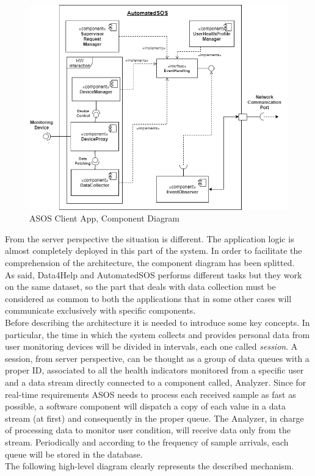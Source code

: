 \begin{flushleft}
{\begin{figure}[H]
	\includegraphics[scale=0.6]{images/uml/ASOS_client_component}
	\caption{ASOS Client App, Component Diagram}
	\label{Figure 3}
\end{figure}

\newpage

{}
From the server perspective the situation is different. The application logic is almost completely deployed in this part of the system. In order to facilitate the comprehension of the architecture, the component diagram has been splitted.\\
As said, Data4Help and AutomatedSOS performs different tasks but they work on the same dataset, so the part that deals with data collection must be considered as common to both the applications that in some other cases will communicate exclusively with specific components.\\
Before describing the architecture it is needed to introduce some key concepts. In particular, the time in which the system collects and provides personal data from user monitoring devices will be divided in intervals, each one called \textit{session}. A session, from server perspective, can be thought as a group of data queues with a proper ID, associated to all the health indicators monitored from a specific user and a data stream directly connected to a component called, Analyzer. Since for real-time requirements ASOS needs to process each received sample as fast as possible, a software component will dispatch a copy of each value in a data stream (at first) and consequently in the proper queue. The Analyzer, in charge of processing data to monitor user condition, will receive data only from the stream. Periodically and according to the frequency of sample arrivals, each queue will be stored in the database.\\
The following high-level diagram clearly represents the described mechanism.

}
\end{flushleft}
